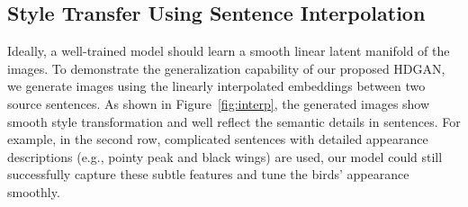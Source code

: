 \documentclass[10pt,twocolumn,letterpaper]{article}
\begin{document}
\subsection{Style Transfer Using Sentence Interpolation}
Ideally, a well-trained model should learn a smooth linear latent manifold of the images. To demonstrate the generalization capability of our proposed HDGAN, we generate images using the linearly interpolated embeddings between two source sentences. 
As shown in Figure~\ref{fig:interp}, the generated images show smooth style transformation and well reflect the semantic details in sentences. 
For example, in the second row, complicated sentences with detailed appearance descriptions (e.g., pointy peak and black wings) are used, our model could still successfully capture these subtle features and tune the birds' appearance smoothly. 



\end{document}

